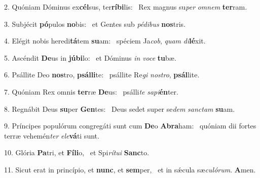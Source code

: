 2. Quóniam Dóminus ex\textbf{cél}sus, ter\textbf{rí}\textbf{bi}lis: \ast\  Rex magnus su\textit{per} \textit{om}\textit{nem} \textbf{ter}ram.\

3. Subjécit \textbf{pó}pulos \textbf{no}bis: \ast\  et Gentes sub \textit{pé}\textit{di}\textit{bus} \textbf{nos}tris.\

4. Elégit nobis heredi\textbf{tá}tem \textbf{su}am: \ast\  spéciem Ja\textit{cob}, \textit{quam} \textit{di}\textbf{lé}xit.\

5. Ascéndit \textbf{De}us in \textbf{jú}\textbf{bi}lo: \ast\  et Dóminus \textit{in} \textit{vo}\textit{ce} \textbf{tu}bæ.\

6. Psállite Deo \textbf{nos}tro, \textbf{psál}\textbf{li}te: \ast\  psállite Re\textit{gi} \textit{nos}\textit{tro}, \textbf{psál}lite.\

7. Quóniam Rex omnis \textbf{ter}ræ \textbf{De}us: \ast\  psálli\textit{te} \textit{sa}\textit{pi}\textbf{én}ter.\

8. Regnábit Deus \textbf{su}per \textbf{Gen}tes: \ast\  Deus sedet super se\textit{dem} \textit{sanc}\textit{tam} \textbf{su}am.\

9. Príncipes populórum congregáti sunt cum \textbf{De}o \textbf{A}\textbf{bra}ham: \ast\  quóniam dii fortes terræ vehemén\textit{ter} \textit{e}\textit{le}\textbf{vá}ti sunt.\

10. Glória \textbf{Pa}tri, et \textbf{Fí}\textbf{li}o, \ast\  et Spi\textit{rí}\textit{tu}\textit{i} \textbf{Sanc}to.\

11. Sicut erat in princípio, et \textbf{nunc}, et \textbf{sem}per, \ast\  et in sǽcula sæ\textit{cu}\textit{ló}\textit{rum}. \textbf{A}men.\

